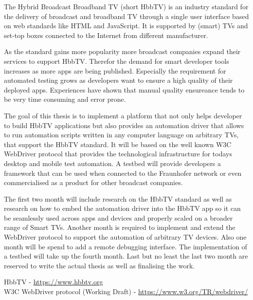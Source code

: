 
The Hybrid Broadcast Broadband TV (short HbbTV) is an industry standard for the delivery of broadcast and broadband TV
through a single user interface based on web standards like HTML and JavaScript. It is supported by (smart) TVs and
set-top boxes connected to the Internet from different manufacturer.


As the standard gains more popularity more broadcast companies expand their services to support HbbTV. Therefor the
demand for smart developer tools increases as more apps are being published. Especially the requirement for
automated testing grows as developers want to ensure a high quality of their deployed apps. Experiences have shown
that manual quality ensureance tends to be very time consuming and error prone.


The goal of this thesis is to implement a platform that not only helps developer to build HbbTV applications but
also provides an automation driver that allows to run automation scripts written in any computer language on
arbitrary TVs, that support the HbbTV standard. It will be based on the well known W3C WebDriver protocol that
provides the technological infrastructure for todays desktop and mobile test automation. A testbed will provide
developers a framework that can be used when connected to the Fraunhofer network or even commercialised as
a product for other broadcast companies.


The first two month will include research on the HbbTV standard as well as research on how to embed the automation driver
into the HbbTV app so it can be seamlessly used across apps and devices and properly scaled on a broader range of
Smart TVs. Another month is required to implement and extend the WebDriver protocol to support the automation
of arbitrary TV devices. Also one month will be spend to add a remote debugging interface. The implementation of
a testbed will take up the fourth month. Last but no least the last two month are reserved to write the actual
thesis as well as finalising the work.


HbbTV - \url{https://www.hbbtv.org} \\
W3C WebDriver protocol (Working Draft) - \url{https://www.w3.org/TR/webdriver/}

